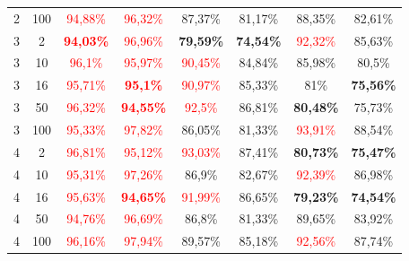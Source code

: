 \begin{table}[ht]
\begin{tabular}{cc|c|c|c|c|c|c}
        {2} & {100} & \textcolor{red}{94,88\%}          & \textcolor{red}{96,32\%}          & {87,37\%}                & {81,17\%}                & {88,35\%}                & {82,61\%}                \\
        {3} & {2}   & \textcolor{red}{\textbf{94,03\%}} & \textcolor{red}{96,96\%}          & \textbf{79,59\%}         & \textbf{74,54\%}         & \textcolor{red}{92,32\%} & {85,63\%}                \\
        {3} & {10}  & \textcolor{red}{96,1\%}           & \textcolor{red}{95,97\%}          & \textcolor{red}{90,45\%} & {84,84\%}                & {85,98\%}                & {80,5\%}                 \\
        {3} & {16}  & \textcolor{red}{95,71\%}          & \textcolor{red}{\textbf{95,1\%}}  & \textcolor{red}{90,97\%} & {85,33\%}                & {81\%}                   & \textbf{75,56\%}         \\
        {3} & {50}  & \textcolor{red}{96,32\%}          & \textcolor{red}{\textbf{94,55\%}} & \textcolor{red}{92,5\%}  & {86,81\%}                & \textbf{80,48\%}         & {75,73\%}                \\
        {3} & {100} & \textcolor{red}{95,33\%}          & \textcolor{red}{97,82\%}          & {86,05\%}                & {81,33\%}                & \textcolor{red}{93,91\%} & {88,54\%}                \\
        {4} & {2}   & \textcolor{red}{96,81\%}          & \textcolor{red}{95,12\%}          & \textcolor{red}{93,03\%} & {87,41\%}                & \textbf{80,73\%}         & \textbf{75,47\%}         \\
        {4} & {10}  & \textcolor{red}{95,31\%}          & \textcolor{red}{97,26\%}          & {86,9\%}                 & {82,67\%}                & \textcolor{red}{92,39\%} & {86,98\%}                \\
        {4} & {16}  & \textcolor{red}{95,63\%}          & \textcolor{red}{\textbf{94,65\%}} & \textcolor{red}{91,99\%} & {86,65\%}                & \textbf{79,23\%}         & \textbf{74,54\%}         \\
        {4} & {50}  & \textcolor{red}{94,76\%}          & \textcolor{red}{96,69\%}          & {86,8\%}                 & {81,33\%}                & {89,65\%}                & {83,92\%}                \\
        {4} & {100} & \textcolor{red}{96,16\%}          & \textcolor{red}{97,94\%}          & {89,57\%}                & {85,18\%}                & \textcolor{red}{92,56\%} & {87,74\%}                \\

\end{tabular}
\end{table}
